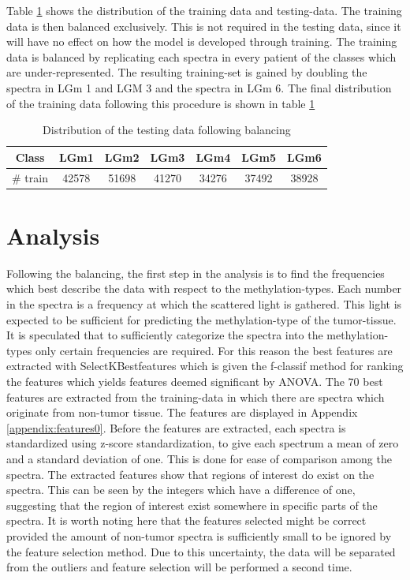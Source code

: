 Table \ref{table:3} shows the distribution of the training data and testing-data. The training data is then balanced exclusively. This is not required in the testing data, since it will have no effect on how the model is developed through training. The training data is balanced by replicating each spectra in every patient of the classes which are under-represented. The resulting training-set is gained by doubling the spectra in LGm 1 and LGM 3 and  the spectra in LGm 6. The final distribution of the training data following this procedure is shown in table \ref{table:3}

\begin{table}[htb]
\centering
 \begin{tabular}{||c c c c c c c||} 
 \hline
 Class & LGm1 & LGm2 & LGm3 & LGm4 & LGm5 & LGm6 \\ [0.5ex] 
 \hline\hline
 \# train & 42578 & 51698 & 41270 & 34276 & 37492 & 38928 \\
 \hline 

\end{tabular}
\caption{Distribution of the testing data following balancing}
\label{table:3}
\end{table}

\section{Analysis}

Following the balancing, the first step in the analysis is to find the frequencies which best describe the data with respect to the methylation-types. Each number in the spectra is a frequency at which the scattered light is gathered. This light is expected to be sufficient for predicting the methylation-type of the tumor-tissue. It is speculated that to sufficiently categorize the spectra into the methylation-types only certain frequencies are required. For this reason the best features are extracted with SelectKBestfeatures \cite{scikit} which is given the f-classif method for ranking the features which yields features deemed significant by ANOVA. The 70 best features are extracted from the training-data in which there are spectra which originate from non-tumor tissue. The features are displayed in Appendix \ref{appendix:features0}. Before the features are extracted, each spectra is standardized using z-score standardization, to give each spectrum a mean of zero and a standard deviation of one. This is done for ease of comparison among the spectra. The extracted features show that regions of interest do exist on the spectra. This can be seen by the integers which have a difference of one, suggesting that the region of interest exist somewhere in specific parts of the spectra. It is worth noting here that the features selected might be correct provided the amount of non-tumor spectra is sufficiently small to be ignored by the feature selection method. Due to this uncertainty, the data will be separated from the outliers and feature selection will be performed a second time.

